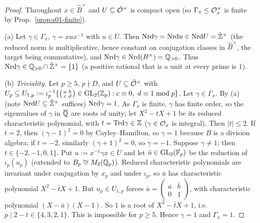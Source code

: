 \begin{proof}
Throughout $x\in\hat B^\times$ and $U\subseteq\hat{\mathcal{O}}^\times$ is compact open (so $\Gamma_x\le\mathcal{O}_x^\times$ is finite by Prop.~\ref{prop:s01-finite}).

(a) Let $\gamma\in\Gamma_x$, $\gamma=xux^{-1}$ with $u\in U$. Then $\mathrm{Nrd}\gamma=\mathrm{Nrd} u\in\mathrm{Nrd} U=\hat{\mathbb{Z}}^\times$ (the reduced norm is
multiplicative, hence constant on conjugation classes in $\hat B^\times$, the target being commutative), and $\mathrm{Nrd}\gamma\in\mathrm{Nrd}(B^\times)=\mathbb{Q}_{>0}$. Thus
$\mathrm{Nrd}\gamma\in\mathbb{Q}_{>0}\cap\hat{\mathbb{Z}}^\times=\{1\}$ (a positive rational that is a unit at every prime is $1$).

(b) \emph{Triviality.} Let $p\ge5$, $p\nmid D$, and $U\subseteq\hat{\mathcal{O}}^\times$ with $U_p\subseteq U_{1,p}:=\iota_p^{-1}\{\left(\begin{smallmatrix}a&b\\c&d\end{smallmatrix}\right)\in\GL_2(\Z_p):c\equiv0,\ d\equiv1\bmod p\}$. Let $\gamma\in\Gamma_x$.
By (a) (note $\mathrm{Nrd} U\subseteq\hat{\mathbb{Z}}^\times$ suffices) $\mathrm{Nrd}\gamma=1$. As $\Gamma_x$ is finite, $\gamma$ has finite order, so the eigenvalues of
$\gamma$ in $\overline{\mathbb{Q}}$ are roots of unity; let $X^2-tX+1$ be its reduced characteristic polynomial, with $t=\mathrm{Trd}\gamma\in\mathbb{Z}$ ($\gamma\in\mathcal{O}_x$ is
integral). Then $|t|\le2$. If $t=2$, then $(\gamma-1)^2=0$ by Cayley--Hamilton, so $\gamma=1$ because $B$ is a division algebra; if
$t=-2$, similarly $(\gamma+1)^2=0$, so $\gamma=-1$. Suppose $\gamma\ne1$; then $t\in\{-2,-1,0,1\}$.
Put $u:=x^{-1}\gamma x\in U$ and let $\bar u\in\mathrm{GL}_2(\mathbb{F}_p)$ be the reduction of $\iota_p(u_p)$ (extended to $B_p\cong M_2(\mathbb{Q}_p)$). Reduced characteristic
polynomials are invariant under conjugation by $x_p$ and under $\iota_p$, so $\bar u$ has characteristic polynomial $X^2-\bar tX+1$. But
$u_p\in U_{1,p}$ forces $\bar u=\left(\begin{smallmatrix}\bar a&\bar b\\0&1\end{smallmatrix}\right)$, with characteristic polynomial
$(X-\bar a)(X-1)$. So $1$ is a root of $X^2-\bar tX+1$, i.e.\ $p\mid2-t\in\{4,3,2,1\}$. This is impossible for $p\ge5$. Hence $\gamma=1$ and $\Gamma_x=1$.


\end{proof}
